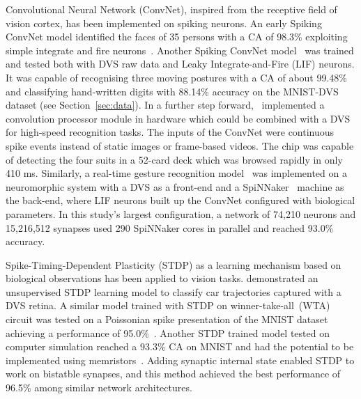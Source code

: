 Convolutional Neural Network (ConvNet), inspired from the receptive field of vision cortex, has been implemented on spiking neurons.
An early Spiking ConvNet model identified the faces of 35 persons with a CA of 98.3\% exploiting simple integrate and fire neurons~\cite{matsugu2002convolutional}.
Another Spiking ConvNet model~\cite{zhao2014feedforward} was trained and tested both with DVS raw data and Leaky Integrate-and-Fire (LIF) neurons.
It was capable of recognising three moving postures with a CA of about 99.48\% and classifying hand-written digits with 88.14\% accuracy on the MNIST-DVS dataset (see Section~\ref{sec:data}).
In a further step forward,~\cite{camunas2012event} implemented a convolution processor module in hardware which could be combined with a DVS for high-speed recognition tasks.
The inputs of the ConvNet were continuous spike events instead of static images or frame-based videos. 
The chip was capable of detecting the four suits in a 52-card deck which was browsed rapidly in only 410 ms.
Similarly, a real-time gesture recognition model~\cite{liu2014real} was implemented on a neuromorphic system with a DVS as a front-end and a SpiNNaker~\cite{furber2014spinnaker} machine as the back-end, where LIF neurons built up the ConvNet configured with biological parameters.
In this study's largest configuration, a network of 74,210 neurons and 15,216,512 synapses used 290 SpiNNaker cores in parallel and reached 93.0\% accuracy. 

Spike-Timing-Dependent Plasticity (STDP) as  a learning mechanism based on biological observations has been applied to vision tasks.
\cite{bichler2012extraction} demonstrated an unsupervised STDP learning model to classify car trajectories captured with a DVS retina. 
A similar model trained with STDP on winner-take-all~(WTA) circuit was tested on a Poissonian spike presentation of the MNIST dataset achieving a performance of 95.0\%~\cite{diehl2015unsupervised}.
Another STDP trained model tested on computer simulation reached a 93.3\% CA on MNIST and had the potential to be implemented using memristors~\cite{bill2014compound}. 
Adding synaptic internal state enabled STDP to work on bistatble synapses, and this method achieved the best performance of 96.5\% among similar network architectures. 

